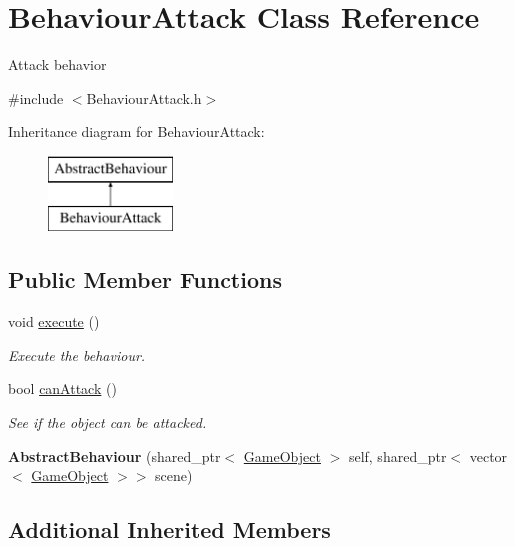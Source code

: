 \hypertarget{class_behaviour_attack}{}\section{Behaviour\+Attack Class Reference}
\label{class_behaviour_attack}


Attack behavior  




{\ttfamily \#include $<$Behaviour\+Attack.\+h$>$}

Inheritance diagram for Behaviour\+Attack\+:\begin{figure}[H]
\begin{center}
\leavevmode
\includegraphics[height=2.000000cm]{class_behaviour_attack}
\end{center}
\end{figure}
\subsection*{Public Member Functions}
\begin{DoxyCompactItemize}
\item 
void \mbox{\hyperlink{class_behaviour_attack_aca669f46a6d32e5e41e7b477be1ee4cf}{execute}} ()
\begin{DoxyCompactList}\small\item\em Execute the behaviour. \end{DoxyCompactList}\item 
bool \mbox{\hyperlink{class_behaviour_attack_a539f70f642f0b21a808631fc64fbf2d8}{can\+Attack}} ()
\begin{DoxyCompactList}\small\item\em See if the object can be attacked. \end{DoxyCompactList}\item 
\mbox{\label{class_behaviour_attack_a8a3a9217b3179f949a1d6a32f340c00c}} 
{\bfseries Abstract\+Behaviour} (shared\+\_\+ptr$<$ \mbox{\hyperlink{class_game_object}{Game\+Object}} $>$ self, shared\+\_\+ptr$<$ vector$<$ \mbox{\hyperlink{class_game_object}{Game\+Object}} $>$$>$ scene)
\end{DoxyCompactItemize}
\subsection*{Additional Inherited Members}


